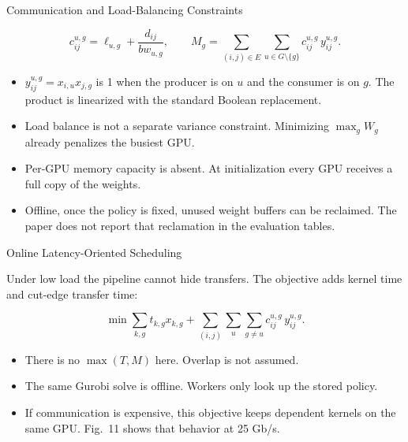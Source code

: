 \begin{frame}[t,label=mm_ts_plan_02]{Communication and Load-Balancing Constraints}

  \par
  \vspace{.06cm}
  \[
    c^{u,g}_{ij}=\ell_{u,g}+\frac{d_{ij}}{bw_{u,g}},
    \qquad
    M_g=\sum_{(i,j)\in E}\sum_{u\in G\setminus\{g\}} c^{u,g}_{ij}\,y^{u,g}_{ij}.
  \]
  \begin{itemize}\footnotesize
    \setlength{\itemsep}{.10cm}
    \item \(y^{u,g}_{ij}=x_{i,u}x_{j,g}\) is 1 when the producer is on \(u\) and the consumer is on \(g\). The product is linearized with the standard Boolean replacement.
    \item Load balance is not a separate variance constraint. Minimizing \(\max_g W_g\) already penalizes the busiest GPU.
    \item Per-GPU memory capacity is absent. At initialization every GPU receives a full copy of the weights.
    \item Offline, once the policy is fixed, unused weight buffers can be reclaimed. The paper does not report that reclamation in the evaluation tables.
  \end{itemize}
  \vspace{.10cm}
\end{frame}

\begin{frame}[t,label=mm_ts_lat_01]{Online Latency-Oriented Scheduling}

  \par
  \vspace{.08cm}
  {\footnotesize Under low load the pipeline cannot hide transfers. The objective adds kernel time and cut-edge transfer time:}\par
  \[
    \min \sum_{k,g} t_{k,g}x_{k,g}
    +\sum_{(i,j)}\sum_{u}\sum_{g\neq u} c^{u,g}_{ij}\,y^{u,g}_{ij}.
  \]
  \begin{itemize}\footnotesize
    \setlength{\itemsep}{.09cm}
    \item There is no \(\max(T,M)\) here. Overlap is not assumed.
    \item The same Gurobi solve is offline. Workers only look up the stored policy.
    \item If communication is expensive, this objective keeps dependent kernels on the same GPU. Fig.~11 shows that behavior at 25 Gb/s.
  \end{itemize}
  \vspace{.10cm}
\end{frame}

